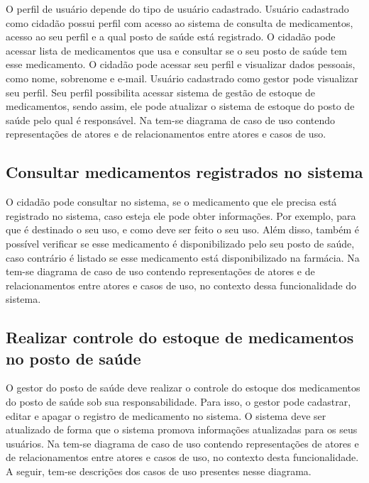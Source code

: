 O perfil de usuário depende do tipo de usuário cadastrado. Usuário  cadastrado como cidadão possui perfil com acesso ao sistema de consulta de medicamentos, acesso ao seu perfil e a qual posto de saúde está registrado. O cidadão pode acessar lista de medicamentos que usa e consultar se o seu posto de saúde tem esse medicamento. O cidadão pode acessar seu perfil e visualizar dados pessoais, como nome, sobrenome e e-mail. Usuário cadastrado como gestor pode visualizar seu perfil. Seu perfil possibilita acessar sistema de gestão de estoque de medicamentos, sendo assim, ele pode atualizar o sistema de estoque do posto de saúde pelo qual é responsável. Na  tem-se diagrama de caso de uso contendo representações de atores e de relacionamentos entre atores e casos de uso.


%

\subsection{Consultar medicamentos registrados no sistema}

O cidadão pode consultar no sistema, se o medicamento que ele precisa está registrado no sistema, caso esteja ele pode obter informações. Por exemplo, para que é destinado o seu uso, e como deve ser feito o seu uso. Além disso, também é possível verificar se esse medicamento é disponibilizado pelo seu posto de saúde, caso contrário é listado se esse medicamento está disponibilizado na farmácia. Na  tem-se diagrama de caso de uso contendo representações de atores e de relacionamentos entre atores e casos de uso, no contexto dessa funcionalidade do sistema.

%


\subsection{Realizar controle do estoque de medicamentos no posto de saúde}

O gestor do posto de saúde deve realizar o controle do estoque dos medicamentos do posto de saúde sob sua responsabilidade. Para isso, o gestor pode cadastrar, editar e apagar o registro de medicamento no sistema. O sistema deve ser atualizado de forma que o sistema promova informações atualizadas para os seus usuários. Na  tem-se diagrama de caso de uso contendo representações de atores e de relacionamentos entre atores e casos de uso, no contexto desta funcionalidade. A seguir, tem-se descrições dos casos de uso presentes nesse diagrama.


